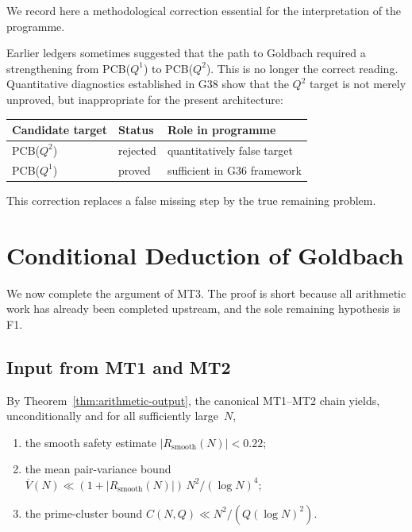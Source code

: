 \documentclass[11pt,a4paper]{article}
\begin{document}
We record here a methodological correction essential for the interpretation of the programme.

Earlier ledgers sometimes suggested that the path to Goldbach required a strengthening from PCB($Q^1$) to PCB($Q^2$). This is no longer the correct reading. Quantitative diagnostics established in G38 show that the $Q^2$ target is not merely unproved, but inappropriate for the present architecture:

\begin{center}
\begin{tabular}{@{}lll@{}}
\toprule
\textbf{Candidate target} & \textbf{Status} & \textbf{Role in programme} \\
\midrule
PCB($Q^2$) & rejected & quantitatively false target \\
PCB($Q^1$) & proved & sufficient in G36 framework \\
\bottomrule
\end{tabular}
\end{center}

This correction replaces a false missing step by the true remaining problem.

\section{Conditional Deduction of Goldbach}

We now complete the argument of MT3. The proof is short because all arithmetic work has already been completed upstream, and the sole remaining hypothesis is F1.

\subsection{Input from MT1 and MT2}

By Theorem~\ref{thm:arithmetic-output}, the canonical MT1--MT2 chain yields, unconditionally and for all sufficiently large~$N$,
\begin{enumerate}
    \item the smooth safety estimate $|R_{\mathrm{smooth}}(N)| < 0.22$;
    \item the mean pair-variance bound $\overline{V}(N) \ll (1 + |R_{\mathrm{smooth}}(N)|) \, N^2/(\log N)^4$;
    \item the prime-cluster bound $C(N,Q) \ll N^2/(Q(\log N)^2)$.
\end{enumerate}
\end{document}

